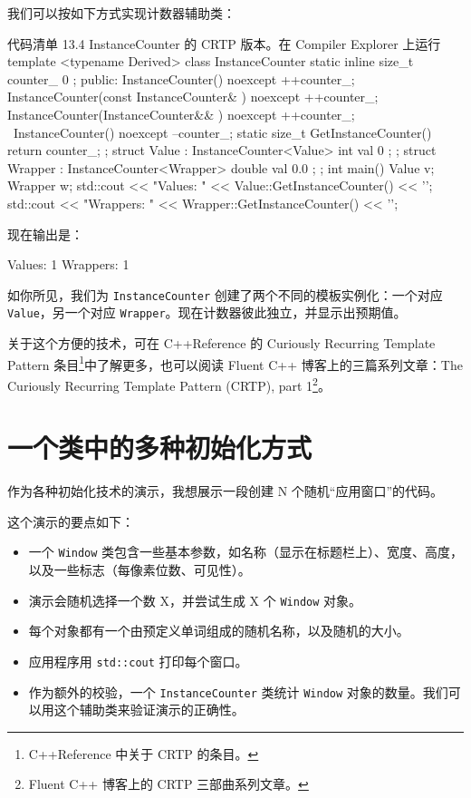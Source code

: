 我们可以按如下方式实现计数器辅助类：

\begin{codeboxt}[cpp]{代码清单 13.4 InstanceCounter 的 CRTP 版本。在 Compiler Explorer 上运行}
template <typename Derived>
class InstanceCounter {
static inline size_t counter_ { 0 };
public:
InstanceCounter() noexcept { ++counter_; }
InstanceCounter(const InstanceCounter& ) noexcept { ++counter_; }
InstanceCounter(InstanceCounter&& ) noexcept { ++counter_; }
~InstanceCounter() noexcept { --counter_; }
static size_t GetInstanceCounter() { return counter_; }
};
struct Value : InstanceCounter<Value> {
int val { 0 };
};
struct Wrapper : InstanceCounter<Wrapper> {
double val { 0.0 };
};
int main() {
Value v;
Wrapper w;
std::cout << "Values: " << Value::GetInstanceCounter() << '\n';
std::cout << "Wrappers: " << Wrapper::GetInstanceCounter() << '\n';
}
\end{codeboxt}

现在输出是：

\begin{codebox}[cpp]
Values: 1
Wrappers: 1
\end{codebox}

如你所见，我们为 \texttt{InstanceCounter} 创建了两个不同的模板实例化：一个对应 \texttt{Value}，另一个对应 \texttt{Wrapper}。现在计数器彼此独立，并显示出预期值。

\begin{myInfoBox}
关于这个方便的技术，可在 C++Reference 的 Curiously Recurring Template Pattern 条目\footnote{C++Reference 中关于 CRTP 的条目。}中了解更多，也可以阅读 Fluent C++ 博客上的三篇系列文章：The Curiously Recurring Template Pattern (CRTP), part 1\footnote{Fluent C++ 博客上的 CRTP 三部曲系列文章。}。
\end{myInfoBox}

\section{一个类中的多种初始化方式}

作为各种初始化技术的演示，我想展示一段创建 N 个随机“应用窗口”的代码。

这个演示的要点如下：

\begin{itemize}
\item 一个 \texttt{Window} 类包含一些基本参数，如名称（显示在标题栏上）、宽度、高度，以及一些标志（每像素位数、可见性）。
\item 演示会随机选择一个数 X，并尝试生成 X 个 \texttt{Window} 对象。
\item 每个对象都有一个由预定义单词组成的随机名称，以及随机的大小。
\item 应用程序用 \texttt{std::cout} 打印每个窗口。
\item 作为额外的校验，一个 \texttt{InstanceCounter} 类统计 \texttt{Window} 对象的数量。我们可以用这个辅助类来验证演示的正确性。
\end{itemize}

